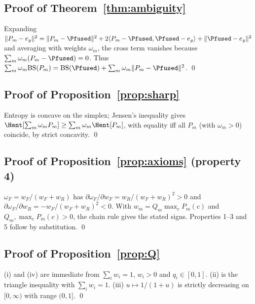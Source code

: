 \subsection*{Proof of Theorem~\ref{thm:ambiguity}}
Expanding $\|P_m-e_y\|^2=\|P_m-\Pfused\|^2+2\langle P_m-\Pfused,\Pfused-e_y\rangle+\|\Pfused-e_y\|^2$ and averaging with weights $\omega_m$, the cross term vanishes because $\sum_m\omega_m(P_m-\Pfused)=0$. Thus $\sum_m\omega_m\mathrm{BS}(P_m)=\mathrm{BS}(\Pfused)+\sum_m\omega_m\|P_m-\Pfused\|^2$. \qed

\subsection*{Proof of Proposition~\ref{prop:sharp}}
Entropy is concave on the simplex; Jensen's inequality gives $\Hent[\sum_m\omega_mP_m]\ge\sum_m\omega_m\Hent[P_m]$, with equality iff all $P_m$ (with $\omega_m>0$) coincide, by strict concavity. \qed

\subsection*{Proof of Proposition~\ref{prop:axioms} (property 4)}
$\omega_F=w_F/(w_F+w_R)$ has $\partial\omega_F/\partial w_F=w_R/(w_F+w_R)^2>0$ and $\partial\omega_F/\partial w_R=-w_F/(w_F+w_R)^2<0$. With $w_m=Q_m\max_cP_m(c)$ and $Q_m,\max_cP_m(c)>0$, the chain rule gives the stated signs. Properties 1--3 and 5 follow by substitution. \qed

\subsection*{Proof of Proposition~\ref{prop:Q}}
(i) and (iv) are immediate from $\sum_iw_i=1$, $w_i>0$ and $q_i\in[0,1]$. (ii) is the triangle inequality with $\sum_iw_i=1$. (iii) $u\mapsto1/(1+u)$ is strictly decreasing on $[0,\infty)$ with range $(0,1]$. \qed

